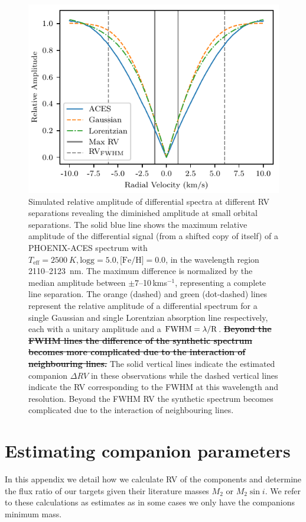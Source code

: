 \documentclass[fleqn,usenatbib]{mnras}
\newcommand{\kmps}{\,kms\(^{-1}\)}	%
\begin{document}
    \begin{figure}
        \centering
        \includegraphics[width=0.8\hsize]{images/fig12.pdf}
        \caption{Simulated relative amplitude of differential spectra at different RV separations revealing the diminished amplitude at small orbital separations. The solid blue line shows the maximum relative amplitude of the differential signal (from a shifted copy of itself) of a PHOENIX-ACES spectrum with \(T_{\textrm{eff}}=2500~K, \textrm{logg}=5.0, \textrm{[Fe/H]}=0.0\), in the wavelength region 2110--2123~nm. The maximum difference is normalized by the median amplitude between \(\pm7\)--10\kmps{}, representing a complete line separation. The orange (dashed) and green (dot-dashed) lines represent the relative amplitude of a differential spectrum for a single Gaussian and single Lorentzian absorption line respectively, each with a unitary amplitude and a \(\rm FWHM = \lambda / R\). \textbf{\st{ Beyond the FWHM lines the difference of the synthetic spectrum becomes more complicated due to the interaction of neighbouring lines.}} The solid vertical lines indicate the estimated companion \(\Delta RV\) in these observations while the dashed vertical lines indicate the RV corresponding to the FWHM at this wavelength and resolution. Beyond the FWHM RV the synthetic spectrum becomes complicated due to the interaction of neighbouring lines.}

        \label{fig:diff_amp}
    \end{figure}

    


    \section{Estimating companion parameters}
    In this appendix we detail how we calculate RV of the components and determine the flux ratio of our targets given their literature masses  \(M_2\) or \(M_{2}\sin{i}\). We refer to these calculations as estimates as in some cases we only have the companions minimum mass.
\end{document}
